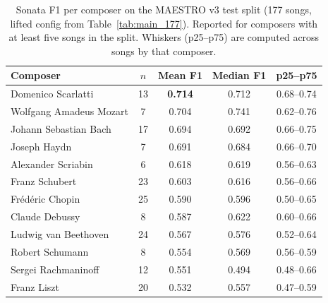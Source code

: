 \begin{table}[t]
\centering
\caption{Sonata F1 per composer on the MAESTRO v3 test split (177 songs, lifted
config from Table~\ref{tab:main_177}). Reported for composers with at least
five songs in the split. Whiskers (p25--p75) are computed across songs by
that composer.}
\label{tab:per_composer}
\begin{tabular}{lcccc}
\toprule
Composer & $n$ & Mean F1 & Median F1 & p25--p75 \\
\midrule
Domenico Scarlatti      & 13 & \textbf{0.714} & 0.712 & 0.68--0.74 \\
Wolfgang Amadeus Mozart &  7 & 0.704 & 0.741 & 0.62--0.76 \\
Johann Sebastian Bach   & 17 & 0.694 & 0.692 & 0.66--0.75 \\
Joseph Haydn            &  7 & 0.691 & 0.684 & 0.66--0.70 \\
\midrule
Alexander Scriabin      &  6 & 0.618 & 0.619 & 0.56--0.63 \\
Franz Schubert          & 23 & 0.603 & 0.616 & 0.56--0.66 \\
Fr\'ed\'eric Chopin     & 25 & 0.590 & 0.596 & 0.50--0.65 \\
Claude Debussy          &  8 & 0.587 & 0.622 & 0.60--0.66 \\
\midrule
Ludwig van Beethoven    & 24 & 0.567 & 0.576 & 0.52--0.64 \\
Robert Schumann         &  8 & 0.554 & 0.569 & 0.56--0.59 \\
Sergei Rachmaninoff     & 12 & 0.551 & 0.494 & 0.48--0.66 \\
Franz Liszt             & 20 & 0.532 & 0.557 & 0.47--0.59 \\
\bottomrule
\end{tabular}
\end{table}


